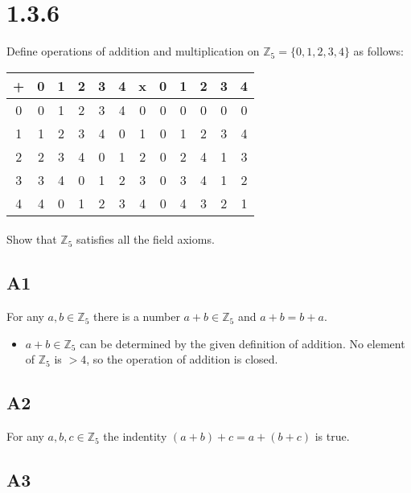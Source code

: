 \documentclass{article}
\begin{document}
\section{1.3.6}

Define operations of addition and multiplication on $\mathbb{Z}_5 = \{0,1,2,3,4\}$ as follows:

\begin{tabular}{|c|c|c|c|c|c||c|c|c|c|c|c|}
    \hline
    + & 0 & 1 & 2 & 3 & 4 & x & 0 & 1 & 2 & 3 & 4 \\
    \hline
    0 & 0 & 1 & 2 & 3 & 4 & 0 & 0 & 0 & 0 & 0 & 0 \\
    \hline
    1 & 1 & 2 & 3 & 4 & 0 & 1 & 0 & 1 & 2 & 3 & 4 \\
    \hline
    2 & 2 & 3 & 4 & 0 & 1 & 2 & 0 & 2 & 4 & 1 & 3 \\
    \hline
    3 & 3 & 4 & 0 & 1 & 2 & 3 & 0 & 3 & 4 & 1 & 2 \\
    \hline
    4 & 4 & 0 & 1 & 2 & 3 & 4 & 0 & 4 & 3 & 2 & 1 \\
    \hline
\end{tabular}

\paragraph{}

Show that $\mathbb{Z}_5$ satisfies all the field axioms.

\subsection{A1}

For any $a, b\in\mathbb{Z}_5$ there is a number $a+b\in\mathbb{Z}_5$ and $a + b = b + a$.

\begin{itemize}
    \item $a+b\in\mathbb{Z}_5$ can be determined by the given definition of addition.  No element of $\mathbb{Z}_5$ is $>4$, so the operation of addition is closed.
\end{itemize}

\subsection{A2}

For any $a, b, c\in\mathbb{Z}_5$ the indentity $(a+b)+c=a+(b+c)$ is true.

\subsection{A3}
\end{document}
